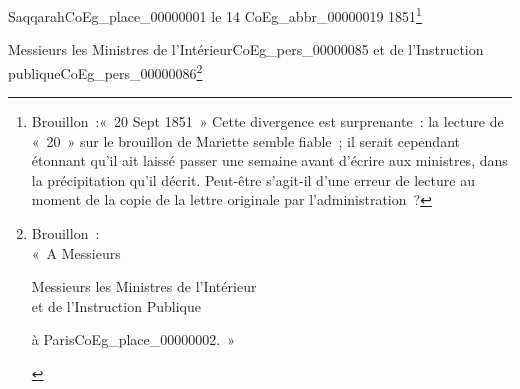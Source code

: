 \documentclass{book}
\begin{document}
\begin{flushright}Saqqarah\gls{CoEg_place_00000001} le 14 \gls{CoEg_abbr_00000019} 1851\footnote{Brouillon~:«~20 Sept 1851~» Cette divergence est surprenante~: la lecture de «~20~» sur le brouillon de Mariette semble fiable~; il serait cependant étonnant qu’il ait laissé passer une semaine avant d’écrire aux ministres, dans la précipitation qu’il décrit. Peut-être s’agit-il d’une erreur de lecture au moment de la copie de la lettre originale par l’administration~?}\end{flushright}
\indent \hspace{1cm} Messieurs les Ministres de l’Intérieur\gls{CoEg_pers_00000085} et de l’Instruction publique\gls{CoEg_pers_00000086}\footnote{Brouillon~:\\
\hspace{1cm}«~A Messieurs\\
\begin{center}Messieurs les Ministres de l’Intérieur\\
\indent et de l’Instruction Publique\end{center}
\begin{flushright}à Paris\gls{CoEg_place_00000002}.~»\end{flushright}}\\
\end{document}

